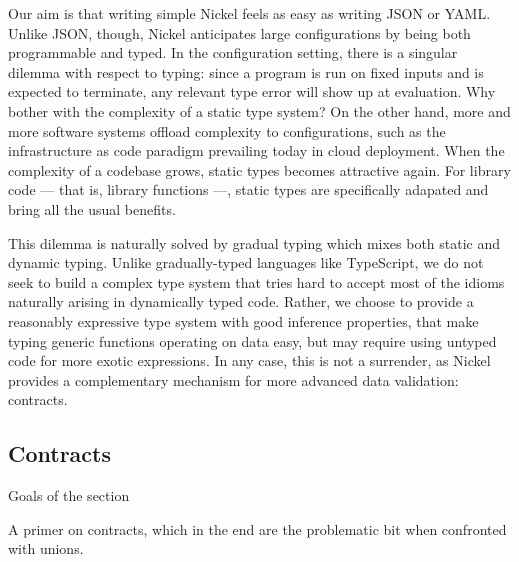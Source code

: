 \documentclass{article}
\begin{document}
Our aim is that writing simple Nickel feels as easy as writing JSON or YAML.
Unlike JSON, though, Nickel anticipates large configurations by being both
programmable and typed. In the configuration setting, there is a singular
dilemma with respect to typing: since a program is run on fixed inputs and is
expected to terminate, any relevant type error will show up at evaluation.  Why
bother with the complexity of a static type system? On the other hand, more and
more software systems offload complexity to configurations, such as the
infrastructure as code paradigm prevailing today in cloud deployment. When the
complexity of a codebase grows, static types becomes attractive again.  For
library code — that is, library functions —, static types are specifically
adapated and bring all the usual benefits.

This dilemma is naturally solved by gradual typing\cite{Siek06gradualtyping}
which mixes both static and dynamic typing. Unlike gradually-typed languages
like TypeScript, we do not seek to build a complex type system that tries hard
to accept most of the idioms naturally arising in dynamically typed code.
Rather, we choose to provide a reasonably expressive type system with good
inference properties, that make typing generic functions operating on data easy,
but may require using untyped code for more exotic expressions.  In any case,
this is not a surrender, as Nickel provides a complementary mechanism for more
advanced data validation: contracts.

\subsection{Contracts}
\color{red}Goals of the section

A primer on contracts, which in the end are the problematic bit when confronted
with unions.\vspace{0.5cm}

\color{black}
\end{document}
